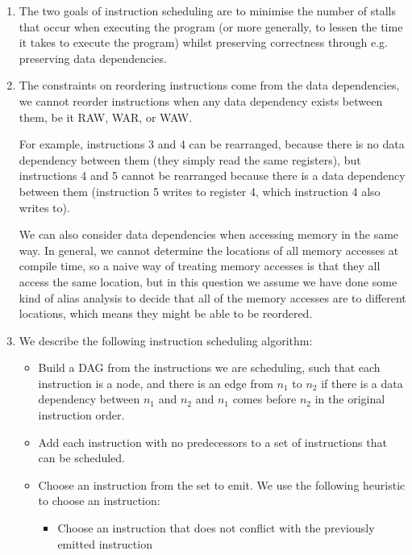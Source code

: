 


\begin{enumerate}[label=(\alph*)]
  \item
  The two goals of instruction scheduling are to minimise the number of stalls that occur when executing the program (or more generally, to lessen the time it takes to execute the program) whilst preserving correctness through e.g. preserving data dependencies.

\item
  The constraints on reordering instructions come from the data dependencies, we cannot reorder instructions when any data dependency exists between them, be it RAW, WAR, or WAW.

  For example, instructions 3 and 4 can be rearranged, because there is no data dependency between them (they simply read the same registers), but instructions 4 and 5 cannot be rearranged because there is a data dependency between them (instruction 5 writes to register 4, which instruction 4 also writes to).

  We can also consider data dependencies when accessing memory in the same way. In general, we cannot determine the locations of all memory accesses at compile time, so a naive way of treating memory accesses is that they all access the same location, but in this question we assume we have done some kind of alias analysis to decide that all of the memory accesses are to different locations, which means they might be able to be reordered.

\item
  We describe the following instruction scheduling algorithm:

  \begin{itemize}
    \item
      Build a DAG from the instructions we are scheduling, such that each instruction is a node, and there is an edge from $n_1$ to $n_2$ if there is a data dependency between $n_1$ and $n_2$ and $n_1$ comes before $n_2$ in the original instruction order.

    \item
      Add each instruction with no predecessors to a set of instructions that can be scheduled.

    \item
      Choose an instruction from the set to emit. We use the following heuristic to choose an instruction:

      \begin{itemize}
        \item
          Choose an instruction that does not conflict with the previously emitted instruction


\end{itemize}
\end{itemize}
\end{enumerate}
